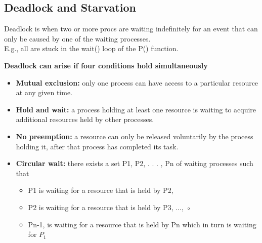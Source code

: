 \documentclass[a4paper, 10pt]{article}
\begin{document}
\subsection{Deadlock and Starvation}
\begin{definitionbox}{}{}
    Deadlock is when two or more procs are waiting indefinitely for an event that can only be caused by one of the waiting processes. \\[2ex]

    E.g., all are stuck in the wait() loop of the P() function.
\end{definitionbox}
\noindent \textbf{Deadlock can arise if four conditions hold simultaneously}
\begin{itemize}
    \item \textbf{Mutual exclusion:} only one process can have access to a particular resource at any given time.
    \item \textbf{Hold and wait:} a process holding at least one resource is waiting to acquire additional resources held by other processes.
    \item  \textbf{No preemption:} a resource can only be released voluntarily by the process holding it, after that process has completed its task.
    \item \textbf{Circular wait:} there exists a set {P1, P2, . . . , Pn} of waiting processes such that
          \begin{itemize}
              \item P1 is waiting for a resource that is held by P2,
              \item P2 is waiting for a resource that is held by P3, ..., ◦
              \item Pn-1, is waiting for a resource that is held by Pn which in turn is waiting for $P_1$
          \end{itemize}
\end{itemize}
\end{document}

